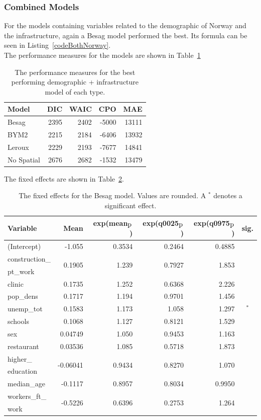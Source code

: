 \subsubsection{Combined Models}
For the models containing variables related to the demographic of Norway and the infrastructure, again a Besag model performed the best. Its formula can be seen in Listing~\ref{codeBothNorway}. \\
The performance measures for the models are shown in Table~\ref{bothNorway}
\begin{table}[H] 
\caption{The performance measures for the best performing demographic + infrastructure model of each type. \label{bothNorway}}
\begin{tabular}{l r r r r}
\toprule
\textbf{Model}	& \textbf{DIC}	& \textbf{WAIC} & \textbf{CPO} & \textbf{MAE} \\
\midrule
Besag  & 2395 & 2402 & -5000 & 13111 \\
BYM2 & 2215 & 2184 & -6406 & 13932\\
Leroux &  2229 & 2193 & -7677 & 14841\\
No Spatial & 2676 & 2682 & -1532 & 13479 \\
\bottomrule
\end{tabular}
\end{table}
The fixed effects are shown in Table~\ref{fixedAllNorway}.
\begin{table}[H] 
\caption{The fixed effects for the Besag model. Values are rounded. A $^*$ denotes a significant effect.\label{fixedAllNorway}}
\begin{tabular}{l r r r r c}
\toprule
\textbf{Variable}	& \textbf{Mean}	& \textbf{exp(mean$_{\hbox{p}}$)} & \textbf{exp(q0025$_{\hbox{p}}$)} & \textbf{exp(q0975$_{\hbox{p}}$)} & \textbf{sig.}\\
\midrule
(Intercept) & -1.055 & 0.3534 & 0.2464 & 0.4885 &\\
construction\_ & \multirow{2}{*}{0.1905} & \multirow{2}{*}{1.239} & \multirow{2}{*}{0.7927} & \multirow{2}{*}{1.853}  \\
pt\_work \\
clinic & 0.1735 & 1.252 & 0.6368 & 2.226 \\
pop\_dens & 0.1717 & 1.194 & 0.9701 & 1.456 \\
unemp\_tot & 0.1583 & 1.173 & 1.058 & 1.297 & $^*$\\
schools & 0.1068 & 1.127 & 0.8121 & 1.529 &\\
sex & 0.04749 & 1.050 & 0.9453 & 1.163 \\
restaurant & 0.03536 & 1.085 & 0.5718 & 1.873\\
higher\_& \multirow{2}{*}{-0.06041} & \multirow{2}{*}{0.9434} & \multirow{2}{*}{0.8270} & \multirow{2}{*}{1.070}\\
education\\
median\_age & -0.1117 & 0.8957 & 0.8034 & 0.9950 & \\
workers\_ft\_ & \multirow{2}{*}{-0.5226} & \multirow{2}{*}{0.6396} & \multirow{2}{*}{0.2753} & \multirow{2}{*}{1.264} \\
work\\
\bottomrule
\end{tabular}
\end{table}

